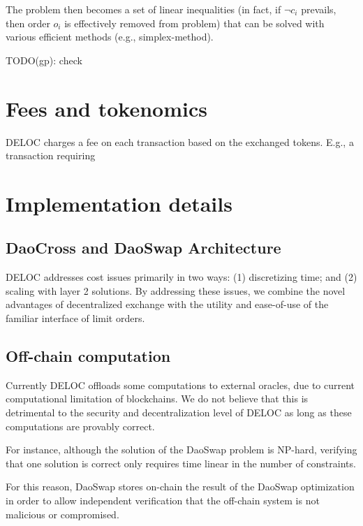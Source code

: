 \documentclass[11pt, reqno]{amsart}
\theoremstyle{definition}
\theoremstyle{remark}
\begin{document}
The problem then becomes a set of linear inequalities (in fact, if $\lnot c_i$
prevails, then order $o_i$ is effectively removed from problem) that can be
solved with various efficient methods (e.g., simplex-method).

TODO(gp): check

\section{Fees and tokenomics}
DELOC charges a fee on each transaction based on the exchanged tokens.
E.g., a transaction requiring

\section{Implementation details}

\subsection{DaoCross and DaoSwap Architecture}
DELOC addresses cost issues primarily in two ways: (1) discretizing time; and
(2) scaling with layer 2 solutions. By addressing these issues, we combine the
novel advantages of decentralized exchange with the utility and ease-of-use of
the familiar interface of limit orders.

\subsection{Off-chain computation}
Currently DELOC offloads some computations to external oracles, due to current
computational limitation of blockchains. We do not believe that this is detrimental
to the security and decentralization level of DELOC as long as these computations
are provably correct.

For instance, although the solution of the DaoSwap problem is NP-hard, verifying
that one solution is correct only requires time linear in the number of
constraints.

For this reason, DaoSwap stores on-chain the result of the DaoSwap optimization
in order to allow independent verification that the off-chain system is not
malicious or compromised.
\end{document}
